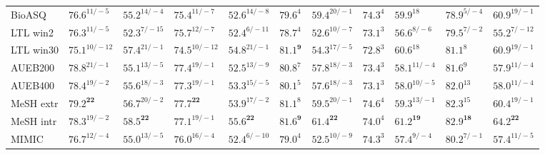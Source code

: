 \documentclass[letterpaper]{article} %
\begin{document}
\begin{table*}[ht]
\begin{tabular}{l l l l l l l l l l l}
BioASQ & $76.6^{11/-5}$ & $55.2^{14/-4}$ & $75.4^{11/-7}$ & $52.6^{14/-8}$ & $79.6^{4}$ & $59.4^{20/-1}$ & $74.3^{4}$ & $59.9^{18}$ & $78.9^{5/-4}$ & $60.9^{19/-1}$ \\
LTL win2 & $76.3^{11/-5}$ & $52.3^{7/-15}$ & $75.7^{12/-7}$ & $52.4^{6/-11}$ & $78.7^{4}$ & $52.6^{10/-7}$ & $73.1^{3}$ & $56.6^{8/-6}$ & $79.5^{7/-2}$ & $55.2^{7/-12}$ \\
LTL win30 & $75.1^{10/-12}$ & $57.4^{21/-1}$ & $74.5^{10/-12}$ & $54.8^{21/-1}$ & $\mathbf{81.1^{9}}$ & $54.3^{17/-5}$ & $72.8^{3}$ & $60.6^{18}$ & $81.1^{8}$ & $60.9^{19/-1}$ \\
AUEB200 & $78.8^{21/-1}$ & $55.1^{13/-5}$ & $77.4^{19/-1}$ & $52.5^{13/-9}$ & $80.8^{7}$ & $57.8^{18/-3}$ & $73.4^{3}$ & $58.1^{11/-4}$ & $81.6^{9}$ & $57.9^{11/-4}$ \\
AUEB400 & $78.4^{19/-2}$ & $55.6^{18/-3}$ & $77.3^{19/-1}$ & $53.3^{15/-5}$ & $80.1^{5}$ & $57.6^{18/-3}$ & $73.1^{3}$ & $58.0^{10/-5}$ & $82.0^{13}$ & $58.0^{11/-4}$ \\
MeSH extr & $\mathbf{79.2^{22}}$ & $56.7^{20/-2}$ & $\mathbf{77.7^{22}}$ & $53.9^{17/-2}$ & $81.1^{8}$ & $59.5^{20/-1}$ & $74.6^{4}$ & $59.3^{13/-1}$ & $82.3^{15}$ & $60.4^{19/-1}$ \\
MeSH intr & $78.3^{19/-2}$ & $\mathbf{58.5^{22}}$ & $77.1^{19/-1}$ & $\mathbf{55.6^{22}}$ & $\mathbf{81.6^{9}}$ & $\mathbf{61.4^{22}}$ & $74.0^{4}$ & $\mathbf{61.2^{19}}$ & $\mathbf{82.9^{18}}$ & $\mathbf{64.2^{22}}$ \\
MIMIC & $76.7^{12/-4}$ & $55.0^{13/-5}$ & $76.0^{16/-4}$ & $52.4^{6/-10}$ & $79.0^{4}$ & $52.5^{10/-9}$ & $74.3^{3}$ & $57.4^{9/-4}$ & $80.2^{7/-1}$ & $57.4^{11/-5}$ \\

\end{tabular}
\end{table*}
\end{document}
